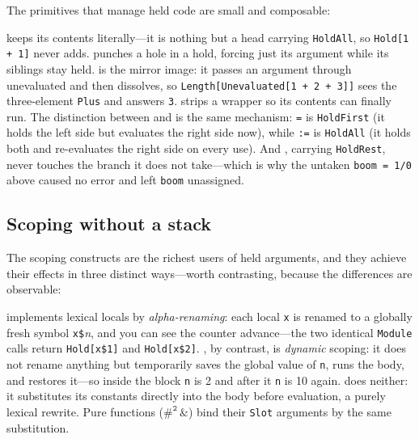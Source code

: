 
The primitives that manage held code are small and composable:


 keeps its contents literally---it is nothing but a head carrying
\texttt{HoldAll}, so \texttt{Hold[1 + 1]} never adds.  punches a hole in a
hold, forcing just its argument while its siblings stay held.  is the
mirror image: it passes an argument through unevaluated and then dissolves, so
\texttt{Length[Unevaluated[1 + 2 + 3]]} sees the three-element \texttt{Plus} and
answers \texttt{3}.  strips a wrapper so its contents can finally run.
The distinction between  and  is the same mechanism: \texttt{=}
is \texttt{HoldFirst} (it holds the left side but evaluates the right side now), while
\texttt{:=} is \texttt{HoldAll} (it holds both and re-evaluates the right side on every
use). And , carrying \texttt{HoldRest}, never touches the branch it does not
take---which is why the untaken \texttt{boom = 1/0} above caused no error and left
\texttt{boom} unassigned.

\subsection*{Scoping without a stack}

The scoping constructs are the richest users of held arguments, and they achieve their
effects in three distinct ways---worth contrasting, because the differences are
observable:


 implements lexical locals by \emph{alpha-renaming}: each local \texttt{x} is
renamed to a globally fresh symbol \texttt{x\$}\textit{n}, and you can see the counter
advance---the two identical \texttt{Module} calls return \texttt{Hold[x\$1]} and
\texttt{Hold[x\$2]}. , by contrast, is \emph{dynamic} scoping: it does not
rename anything but temporarily saves the global value of \texttt{n}, runs the body,
and restores it---so inside the block \texttt{n} is 2 and after it \texttt{n} is 10
again.  does neither: it substitutes its constants directly into the body
before evaluation, a purely lexical rewrite. Pure functions
(\(\mathtt{\#^2\, \&}\)) bind their \texttt{Slot} arguments by the same
substitution.

